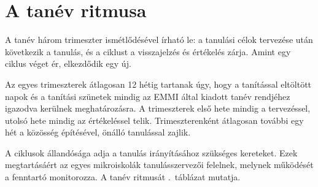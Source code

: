 \section{A tanév ritmusa}
\label{sec:tanev_ritmusa}
A tanév három trimeszter ismétlődésével írható le: a tanulási célok tervezése után következik a tanulás, és a ciklust a visszajelzés és értékelés zárja.	Amint egy ciklus véget ér, elkezdődik egy új.


Az egyes trimeszterek átlagosan 12 hétig tartanak úgy, hogy a tanítással eltöltött napok  és a tanítási szünetek mindig az EMMI által kiadott tanév rendjéhez igazodva kerülnek meghatározásra. A trimeszterek első hete mindig a tervezéssel, utolsó hete mindig az értékeléssel telik. Trimeszterenként átlagosan további egy hét a közösség építésével, önálló tanulással  zajlik.

A ciklusok állandósága adja a tanulás irányításához szükséges kereteket. Ezek megtartásáért az egyes mikroiskolák tanulásszervezői felelnek, melynek működését a fenntartó monitorozza. A tanév ritmusát .~táblázat mutatja.


